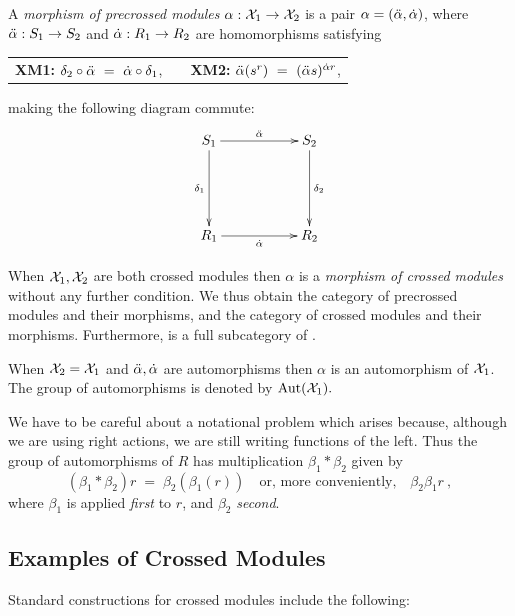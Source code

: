 A \emph{morphism of precrossed modules}  
$\alpha : \mathcal{X}_1 \to \mathcal{X}_2$ 
is a pair  $\alpha = (\ddot{\alpha}, \dot{\alpha})$, where 
$\ddot{\alpha} : S_1 \to S_2$ and $\dot{\alpha} : R_1 \to R_2$ are homomorphisms satisfying
\begin{center} 
\begin{tabular}{ c c c  } 
\textbf{XM1:} \quad $\delta_2 \circ \ddot{\alpha} ~=~ \dot{\alpha} \circ \delta_1$,  & & 
\textbf{XM2:} \quad $\ddot{\alpha}(s^r) ~=~ (\ddot{\alpha}  s)^{\dot{\alpha} r}$, 
\end{tabular} 
\end{center} 
making the following diagram commute:
\begin{equation} \label{eq:prexmod-morph} 
\vcenter{\xymatrix{ 
  S_1 \ar[rr]^{\dda} \ar[dd]_{\delta_1}
     && S_2 \ar[dd]^{\delta_2} \\
     &&  \\
  R_1 \ar[rr]_{\da}
     && R_2
}}
\end{equation} 

When  $\mathcal{X}_1, \mathcal{X}_2$  are both crossed modules then  $\alpha$
is a \emph{morphism of crossed modules} 
without any further condition.
We thus obtain the category
{{\catPreXMod}} of precrossed modules and their morphisms,
and the category {\catXMod} of crossed modules and their morphisms.
Furthermore, {\catXMod} is a full subcategory of {\catPreXMod}.

When $\mathcal{X}_2 = \mathcal{X}_1$
and $\ddot{\alpha},\dot{\alpha}$ are automorphisms then 
$\alpha$  is an automorphism of $\mathcal{X}_1$. 
The group of automorphisms is denoted 
by $\mathrm{Aut}(\mathcal{X}_1).$ 

We have to be careful about a notational problem 
which arises because, although we are using right actions,
we are still writing functions of the left.
Thus the group of automorphisms of $R$ has multiplication
$\beta_1 * \beta_2$  given by
$$ 
(\beta_1 * \beta_2)r \;=\; \beta_2(\beta_1(r))
\quad \mbox{or, more conveniently,} \quad
\beta_2 \beta_1 r~,
$$ 
where $\beta_1$ is applied \emph{first} to $r$, 
and $\beta_2$ \emph{second}.



\subsection{Examples of Crossed Modules} \label{subsec:ex-xmod} 

Standard constructions for crossed modules include the following:

